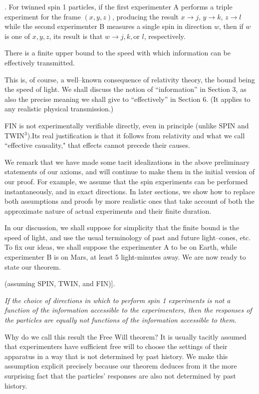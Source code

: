 \documentclass[12pt]{amsart}
\begin{document}
.
 For twinned spin 1 particles, if the first experimenter A performs a triple experiment 
for the frame $(x,y,z)$, producing the result 
   $x \to j$, $y\to k$, $z \to l$
while the second experimenter B measures a single spin in direction $w$, then if $w$ 
is one of $x, y, z$, its result is that $w \to j, k, \mbox {or } l$, respectively.
     
     
There is a finite upper bound to the speed with which information can
be effectively transmitted.

This is, of course, a well--known consequence of relativity theory,
the bound being the speed of light.  We shall discuss the notion of
``information'' in Section 3, as also the precise meaning we shall give to
``effectively'' in Section 6. (It applies to any realistic physical transmission.)

FIN is not experimentally verifiable directly, even in principle (unlike SPIN and TWIN$^3$).Its real justification is that it follows from relativity and what we call ``effective causality," that effects cannot precede their causes.

We remark that we have made some tacit idealizations in the above preliminary statements 
of our axioms, and will continue to make them in the initial version of our proof.
For example, we assume that the spin experiments can be performed instantaneously, and
in exact directions.  In later sections, we show how to replace both assumptions and
proofs by more realistic ones that take account of both the approximate nature of
actual experiments and their finite duration.

In our discussion, we shall suppose for simplicity that the finite bound
is the speed of light, and use the usual terminology of past and future light--cones, etc.
To fix our ideas, we shall suppose the experimenter A to be on Earth, while 
experimenter B is on Mars, at least 5 light-minutes away.
We are now ready to state our theorem.

 (assuming SPIN, TWIN, and FIN)]. 

{\it If the choice of directions in which to perform spin 1 
experiments is not a function
of the information accessible to the experimenters, then the responses of the
particles are equally not functions of the information accessible to
them.}

Why do we call this result the Free Will theorem?  
  It is usually tacitly assumed that experimenters have sufficient free will to
choose the settings of their apparatus in a way that is not determined by past
history.  We make this assumption explicit precisely because our theorem deduces
from it the more surprising fact that the particles' responses are also not
determined by past history. 
\end{document}

